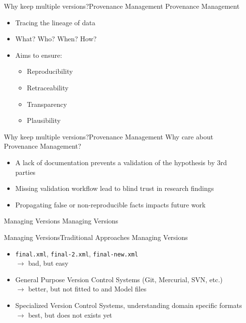 \begin{frame}{Why keep multiple versions?}{Provenance Management}
	{\Large Provenance Management}
	\\[2.5em]
	\begin{itemize}
		\item Tracing the lineage of data
		\item What? Who? When? How?
		\item Aims to ensure: \citep{Meyer2015}
		\begin{itemize}
			\item Reproducibility
			\item Retraceability
			\item Transparency
			\item Plausibility
		\end{itemize}
	\end{itemize}
\end{frame}

\begin{frame}{Why keep multiple versions?}{Provenance Management}
	{\Large Why care about Provenance Management?}
	\\[2.5em]
	\begin{itemize}
		\item A lack of documentation prevents a validation of the hypothesis by 3rd parties \citep{Mesirov2010, Peng2011}
		\item Missing validation workflow lead to blind trust in research findings
		\item Propagating false or non-reproducible facts impacts future work
	\end{itemize}

\end{frame}

\begin{frame}{Managing Versions}{}
	\centering
	\LARGE Managing Versions
\end{frame}

\begin{frame}{Managing Versions}{Traditional Approaches}
	{\Large Managing Versions}
	\\[2.5em]
	\begin{itemize}
		\item \texttt{final.xml}, \texttt{final-2.xml}, \texttt{final-new.xml} \\
			$\rightarrow$ bad, but easy
		
		\item General Purpose Version Control Systems (Git, Mercurial, SVN, etc.) \\
			$\rightarrow$ better, but not fitted to \xml and Model files
			
		\item Specialized Version Control Systems, understanding domain specific formats \\
			$\rightarrow$ best, but does not exists yet
	\end{itemize}
\end{frame}

